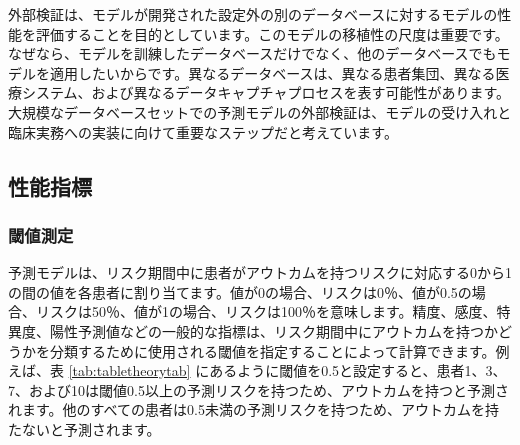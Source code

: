 \documentclass[
  11pt]{book}
\theoremstyle{definition}
\theoremstyle{definition}
\theoremstyle{definition}
\theoremstyle{definition}
\theoremstyle{remark}
\begin{document}
外部検証は、モデルが開発された設定外の別のデータベースに対するモデルの性能を評価することを目的としています。このモデルの移植性の尺度は重要です。なぜなら、モデルを訓練したデータベースだけでなく、他のデータベースでもモデルを適用したいからです。異なるデータベースは、異なる患者集団、異なる医療システム、および異なるデータキャプチャプロセスを表す可能性があります。大規模なデータベースセットでの予測モデルの外部検証は、モデルの受け入れと臨床実務への実装に向けて重要なステップだと考えています。

\subsection{性能指標}\label{performance}

\subsubsection*{閾値測定}\label{ux95beux5024ux6e2cux5b9a}

予測モデルは、リスク期間中に患者がアウトカムを持つリスクに対応する0から1の間の値を各患者に割り当てます。値が0の場合、リスクは0％、値が0.5の場合、リスクは50％、値が1の場合、リスクは100％を意味します。精度、感度、特異度、陽性予測値などの一般的な指標は、リスク期間中にアウトカムを持つかどうかを分類するために使用される閾値を指定することによって計算できます。例えば、表 \ref{tab:tabletheorytab} にあるように閾値を0.5と設定すると、患者1、3、7、および10は閾値0.5以上の予測リスクを持つため、アウトカムを持つと予測されます。他のすべての患者は0.5未満の予測リスクを持つため、アウトカムを持たないと予測されます。     
\end{document}
